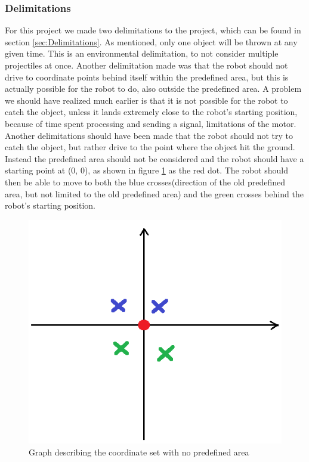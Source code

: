 \subsubsection{Delimitations}
For this project we made two delimitations to the project, which can be found in section \ref{sec:Delimitations}. As mentioned, only one object will be thrown at any given time. This is an environmental delimitation, to not consider multiple projectiles at once. \newline
Another delimitation made was that the robot should not drive to coordinate points behind itself within the predefined area, but this is actually possible for the robot to do, also outside the predefined area. A problem we should have realized much earlier is that it is not possible for the robot to catch the object, unless it lands extremely close to the robot’s starting position, because of time spent processing and sending a signal, limitations of the motor. Another delimitations should have been made that the robot should not try to catch the object, but rather drive to the point where the object hit the ground. \newline
Instead the predefined area should not be considered and the robot should have a starting point at (0, 0), as shown in figure \ref{figure:graph} as the red dot. The robot should then be able to move to both the blue crosses(direction of the old predefined area, but not limited to the old predefined area) and the green crosses behind the robot’s starting position. 


\begin{figure}[h]
	\centering
	\includegraphics[scale=0.5]{billeder/discussion-graph.png}
	\caption{Graph describing the coordinate set with no predefined area}
	\label{figure:graph}
\end{figure}



